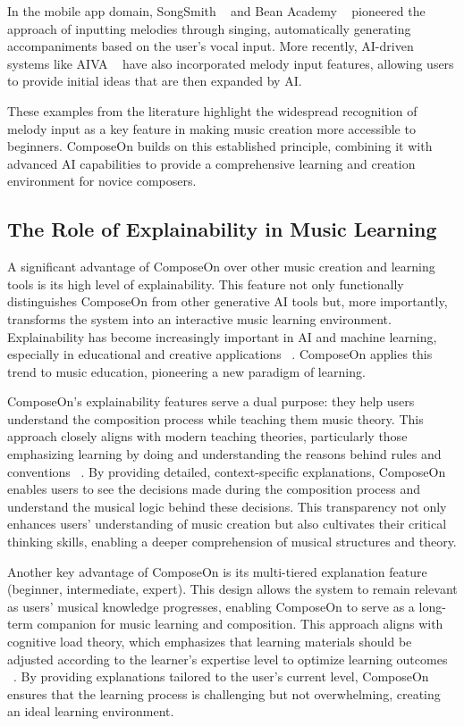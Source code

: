 In the mobile app domain, SongSmith ~\cite{simon2008} and Bean Academy ~\cite{r16} pioneered the approach of inputting melodies through singing, automatically generating accompaniments based on the user's vocal input. More recently, AI-driven systems like AIVA ~\cite{hadjeres2017} have also incorporated melody input features, allowing users to provide initial ideas that are then expanded by AI.

These examples from the literature highlight the widespread recognition of melody input as a key feature in making music creation more accessible to beginners. ComposeOn builds on this established principle, combining it with advanced AI capabilities to provide a comprehensive learning and creation environment for novice composers.

\subsection{The Role of Explainability in Music Learning}

A significant advantage of ComposeOn over other music creation and learning tools is its high level of explainability. This feature not only functionally distinguishes ComposeOn from other generative AI tools but, more importantly, transforms the system into an interactive music learning environment. Explainability has become increasingly important in AI and machine learning, especially in educational and creative applications ~\cite{gunning2019,r17}. ComposeOn applies this trend to music education, pioneering a new paradigm of learning.

ComposeOn's explainability features serve a dual purpose: they help users understand the composition process while teaching them music theory. This approach closely aligns with modern teaching theories, particularly those emphasizing learning by doing and understanding the reasons behind rules and conventions ~\cite{kolb2014experiential}. By providing detailed, context-specific explanations, ComposeOn enables users to see the decisions made during the composition process and understand the musical logic behind these decisions. This transparency not only enhances users' understanding of music creation but also cultivates their critical thinking skills, enabling a deeper comprehension of musical structures and theory.

Another key advantage of ComposeOn is its multi-tiered explanation feature (beginner, intermediate, expert). This design allows the system to remain relevant as users' musical knowledge progresses, enabling ComposeOn to serve as a long-term companion for music learning and composition. This approach aligns with cognitive load theory, which emphasizes that learning materials should be adjusted according to the learner's expertise level to optimize learning outcomes ~\cite{sweller2019cognitive}. By providing explanations tailored to the user's current level, ComposeOn ensures that the learning process is challenging but not overwhelming, creating an ideal learning environment.

